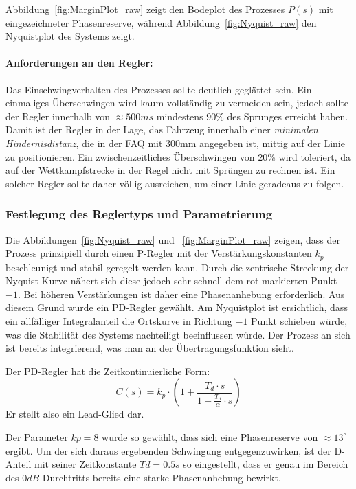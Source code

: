\documentclass[main.tex]{subfiles} %
\begin{document}
Abbildung~\ref{fig:MarginPlot_raw} zeigt den Bodeplot des Prozesses $P(s)$ mit
eingezeichneter Phasenreserve, während Abbildung~\ref{fig:Nyquist_raw} den
Nyquistplot des Systems zeigt.

\paragraph{Anforderungen an den Regler:} Das Einschwingverhalten des Prozesses sollte deutlich geglättet sein. Ein
einmaliges Überschwingen wird kaum vollständig zu vermeiden sein, jedoch sollte
der Regler innerhalb von $\approx 500 ms$ mindestens 90\% des Sprunges erreicht
haben. Damit ist der Regler in der Lage, das Fahrzeug innerhalb einer
\textit{minimalen Hindernisdistanz}, die in der FAQ mit 300mm angegeben ist,
mittig auf der Linie zu positionieren. Ein zwischenzeitliches Überschwingen von
20\% wird toleriert, da auf der Wettkampfstrecke in der Regel nicht mit
Sprüngen zu rechnen ist. Ein solcher Regler sollte daher völlig ausreichen, um
einer Linie geradeaus zu folgen.

\subsubsection*{Festlegung des Reglertyps und Parametrierung}

Die Abbildungen~\ref{fig:Nyquist_raw} und ~\ref{fig:MarginPlot_raw} zeigen,
dass der Prozess prinzipiell durch einen P-Regler mit der
Verstärkungskonstanten $k_p$ beschleunigt und stabil geregelt werden kann.
Durch die zentrische Streckung der Nyquist-Kurve nähert sich diese jedoch sehr
schnell dem rot markierten Punkt $-1$. Bei höheren Verstärkungen ist daher eine
Phasenanhebung erforderlich. Aus diesem Grund wurde ein PD-Regler gewählt. Am
Nyquistplot ist ersichtlich, dass ein allfälliger Integralanteil die Ortskurve
in Richtung $-1$ Punkt schieben würde, was die Stabilität des Systems
nachteiligt beeinflussen würde. Der Prozess an sich ist bereits integrierend,
was man an der Übertragungsfunktion sieht.

Der PD-Regler hat die Zeitkontinuierliche Form:
\[
    C(s) = k_p \cdot (1 + \frac{T_d \cdot s}{1 + \frac{T_d}{\alpha} \cdot s})
\]
Er stellt also ein Lead-Glied dar.

Der Parameter $kp = 8$ wurde so gewählt, dass sich eine Phasenreserve von
$\approx 13^\circ$ ergibt. Um der sich daraus ergebenden Schwingung
entgegenzuwirken, ist der D-Anteil mit seiner Zeitkonstante $Td = 0.5s$ so
eingestellt, dass er genau im Bereich des $0 dB$ Durchtritts bereits eine
starke Phasenanhebung bewirkt.
\end{document}
